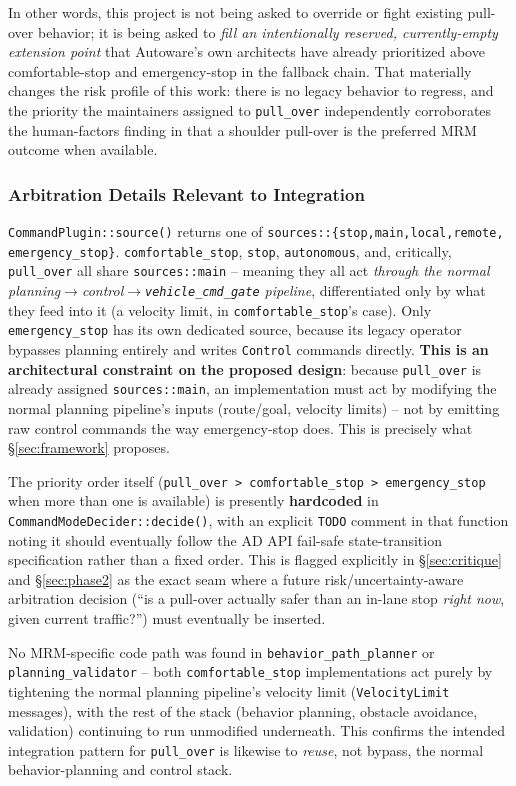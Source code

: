 \documentclass[11pt]{article}
\newcommand{\code}[1]{\texttt{#1}}
\newcommand{\pkg}[1]{\texttt{#1}}
\begin{document}
In other words, this project is not being asked to override or fight existing pull-over behavior;
it is being asked to \emph{fill an intentionally reserved, currently-empty extension point} that
Autoware's own architects have already prioritized above comfortable-stop and emergency-stop in the
fallback chain. That materially changes the risk profile of this work: there is no legacy behavior
to regress, and the priority the maintainers assigned to \code{pull\_over} independently corroborates
the human-factors finding in \cite{vu2023mrm} that a shoulder pull-over is the preferred MRM
outcome when available.

\subsubsection{Arbitration Details Relevant to Integration}
\code{CommandPlugin::source()} returns one of \code{sources::\{stop,main,local,remote,
emergency\_stop\}}. \code{comfortable\_stop}, \code{stop}, \code{autonomous}, and, critically,
\code{pull\_over} all share \code{sources::main} -- meaning they all act \emph{through the normal
planning$\to$control$\to$\pkg{vehicle\_cmd\_gate} pipeline}, differentiated only by what they feed
into it (a velocity limit, in \code{comfortable\_stop}'s case). Only \code{emergency\_stop} has its
own dedicated source, because its legacy operator bypasses planning entirely and writes
\code{Control} commands directly. \textbf{This is an architectural constraint on the proposed
design}: because \code{pull\_over} is already assigned \code{sources::main}, an implementation must
act by modifying the normal planning pipeline's inputs (route/goal, velocity limits) -- not by
emitting raw control commands the way emergency-stop does. This is precisely what
\S\ref{sec:framework} proposes.

The priority order itself (\code{pull\_over > comfortable\_stop > emergency\_stop} when more than
one is available) is presently \textbf{hardcoded} in
\code{CommandModeDecider::decide()}, with an explicit \code{TODO} comment in that function noting
it should eventually follow the AD API fail-safe state-transition specification rather than a fixed
order. This is flagged explicitly in \S\ref{sec:critique} and \S\ref{sec:phase2} as the exact seam
where a future risk/uncertainty-aware arbitration decision (``is a pull-over actually safer than an
in-lane stop \emph{right now}, given current traffic?'') must eventually be inserted.

No MRM-specific code path was found in \pkg{behavior\_path\_planner} or \pkg{planning\_validator} --
both \code{comfortable\_stop} implementations act purely by tightening the normal planning
pipeline's velocity limit (\code{VelocityLimit} messages), with the rest of the stack (behavior
planning, obstacle avoidance, validation) continuing to run unmodified underneath. This confirms the
intended integration pattern for \code{pull\_over} is likewise to \emph{reuse}, not bypass, the
normal behavior-planning and control stack.
\end{document}
